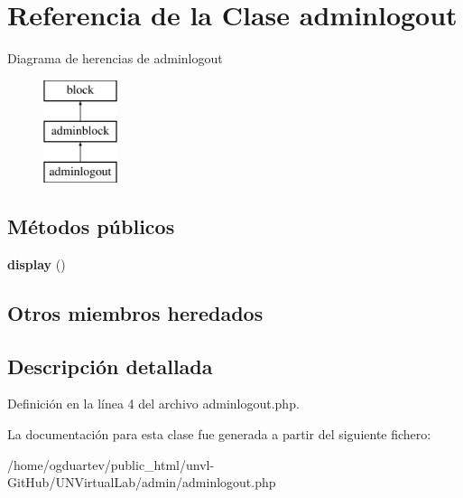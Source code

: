 \hypertarget{classadminlogout}{}\section{Referencia de la Clase adminlogout}
\label{classadminlogout}
Diagrama de herencias de adminlogout\begin{figure}[H]
\begin{center}
\leavevmode
\includegraphics[height=3.000000cm]{classadminlogout}
\end{center}
\end{figure}
\subsection*{Métodos públicos}
\begin{DoxyCompactItemize}
\item 
\mbox{\label{classadminlogout_a75f9b062b4c8cd673c544a0c2ce62034}} 
{\bfseries display} ()
\end{DoxyCompactItemize}
\subsection*{Otros miembros heredados}


\subsection{Descripción detallada}


Definición en la línea 4 del archivo adminlogout.\+php.



La documentación para esta clase fue generada a partir del siguiente fichero\+:\begin{DoxyCompactItemize}
\item 
/home/ogduartev/public\+\_\+html/unvl-\/\+Git\+Hub/\+U\+N\+Virtual\+Lab/admin/adminlogout.\+php\end{DoxyCompactItemize}
